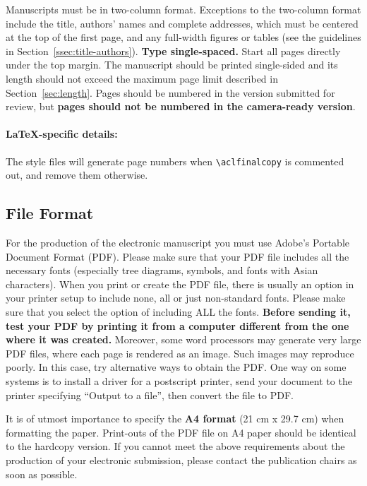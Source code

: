 \documentclass[11pt,a4paper]{article}
\begin{document}
Manuscripts must be in two-column format.
Exceptions to the two-column format include the title, authors' names and complete addresses, which must be centered at the top of the first page, and any full-width figures or tables (see the guidelines in Section~\ref{ssec:title-authors}).
\textbf{Type single-spaced.}
Start all pages directly under the top margin.
The manuscript should be printed single-sided and its length should not exceed the maximum page limit described in Section~\ref{sec:length}.
Pages should be numbered in the version submitted for review, but \textbf{pages should not be numbered in the camera-ready version}.

\paragraph{\LaTeX-specific details:}
The style files will generate page numbers when {\small\verb|\aclfinalcopy|} is commented out, and remove them otherwise.


\subsection{File Format}
\label{sect:pdf}

For the production of the electronic manuscript you must use Adobe's Portable Document Format (PDF).
Please make sure that your PDF file includes all the necessary fonts (especially tree diagrams, symbols, and fonts with Asian characters).
When you print or create the PDF file, there is usually an option in your printer setup to include none, all or just non-standard fonts.
Please make sure that you select the option of including ALL the fonts.
\textbf{Before sending it, test your PDF by printing it from a computer different from the one where it was created.}
Moreover, some word processors may generate very large PDF files, where each page is rendered as an image.
Such images may reproduce poorly.
In this case, try alternative ways to obtain the PDF.
One way on some systems is to install a driver for a postscript printer, send your document to the printer specifying ``Output to a file'', then convert the file to PDF.

It is of utmost importance to specify the \textbf{A4 format} (21 cm x 29.7 cm) when formatting the paper.
Print-outs of the PDF file on A4 paper should be identical to the hardcopy version.
If you cannot meet the above requirements about the production of your electronic submission, please contact the publication chairs as soon as possible.
\end{document}
